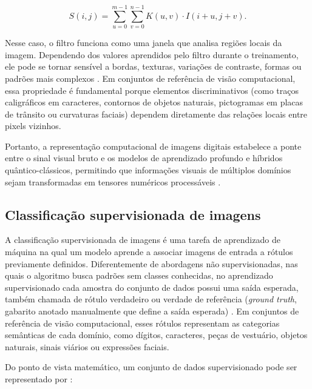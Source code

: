 \documentclass[
    12pt,
    openright,
    oneside,
    a4paper,
    english,
    brazil
]{abntex2}
\begin{document}
\begin{equation}
\label{eq:convolucao_basica}
S(i,j) = \sum_{u=0}^{m-1}\sum_{v=0}^{n-1} K(u,v) \cdot I(i+u,j+v).
\end{equation}

Nesse caso, o filtro funciona como uma janela que analisa regiões locais da imagem. Dependendo dos valores aprendidos pelo filtro durante o treinamento, ele pode se tornar sensível a bordas, texturas, variações de contraste, formas ou padrões mais complexos \cite{gonzalez2008digital,szeliski2022computer}. Em conjuntos de referência de visão computacional, essa propriedade é fundamental porque elementos discriminativos (como traços caligráficos em caracteres, contornos de objetos naturais, pictogramas em placas de trânsito ou curvaturas faciais) dependem diretamente das relações locais entre pixels vizinhos.

Portanto, a representação computacional de imagens digitais estabelece a ponte entre o sinal visual bruto e os modelos de aprendizado profundo e híbridos quântico-clássicos, permitindo que informações visuais de múltiplos domínios sejam transformadas em tensores numéricos processáveis \cite{szeliski2022computer,goodfellow2016deep}.

\subsection{Classificação supervisionada de imagens}
\label{subsec:classificacao_supervisionada_imagens}

A classificação supervisionada de imagens é uma tarefa de aprendizado de máquina na qual um modelo aprende a associar imagens de entrada a rótulos previamente definidos. Diferentemente de abordagens não supervisionadas, nas quais o algoritmo busca padrões sem classes conhecidas, no aprendizado supervisionado cada amostra do conjunto de dados possui uma saída esperada, também chamada de rótulo verdadeiro ou verdade de referência (\textit{ground truth}, gabarito anotado manualmente que define a saída esperada) \cite{goodfellow2016deep,deisenroth2020mathematics}. Em conjuntos de referência de visão computacional, esses rótulos representam as categorias semânticas de cada domínio, como dígitos, caracteres, peças de vestuário, objetos naturais, sinais viários ou expressões faciais.

Do ponto de vista matemático, um conjunto de dados supervisionado pode ser representado por \cite{deisenroth2020mathematics,goodfellow2016deep}:
\end{document}
